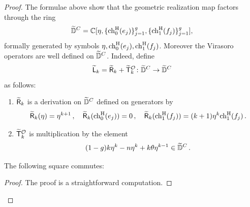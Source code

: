 \documentclass[a4paper, 12pt]{amsart}
\begin{document}
\begin{proof}
The formulae above show that the geometric realization map factors through the ring 
\[\widetilde{{\mathbb{D}}}^C={\mathbb{C}}[\eta, \{\mathrm{ch}_0^{\mathrm{H}}(e_j)\}_{j=1}^g, \{\mathrm{ch}_1^{\mathrm{H}}(f_j)\}_{j=1}^g],\]
formally generated by symbols $\eta, \mathrm{ch}_0^{\mathrm{H}}(e_j), \mathrm{ch}_1^{\mathrm{H}}(f_j)$. Moreover the Virasoro operators are well defined on $\widetilde{{\mathbb{D}}}^C$. Indeed, define
\[\widetilde {{\mathsf{L}}}_k=\widetilde {\mathsf{R}}_k+\widetilde {{\mathsf{T}}}_k^{\mathcal O}\colon \widetilde{{\mathbb{D}}}^C\to \widetilde{{\mathbb{D}}}^C\]
as follows:
\begin{enumerate}
    \item $\widetilde {\mathsf{R}}_k$ is a derivation on $\widetilde {{\mathbb{D}}}^C$ defined on generators by
\[
        \widetilde {\mathsf{R}}_k(\eta)=\eta^{k+1}\, , \quad     \widetilde {\mathsf{R}}_k(\mathrm{ch}_0^{\mathrm{H}}(e_j))=0\, , \quad \widetilde {\mathsf{R}}_k(\mathrm{ch}_1^{\mathrm{H}}(f_j))=(k+1)\eta^k\mathrm{ch}_1^{\mathrm{H}}(f_j)\,.
        \]
    \item $\widetilde {{\mathsf{T}}}_k^{\mathcal O}$ is multiplication by the element
    \[(1-g)k\eta^k-n \eta^k+k \theta \eta^{k-1}\in \widetilde {{\mathbb{D}}}^C\,.\]
    \end{enumerate}
    
    
    \begin{claim}
    The following square commutes:
    \begin{center}
    \end{center}
    \end{claim}
    \begin{proof}
    The proof is a straightforward computation.\qedhere
    \end{proof}
    

\end{proof}
\end{document}
